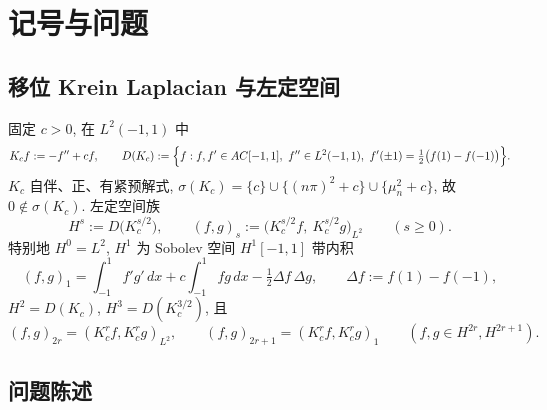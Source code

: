 \documentclass[UTF8]{ctexart}
\begin{document}
\tableofcontents

\section{记号与问题}

\subsection{移位 Krein Laplacian 与左定空间}

固定 $c > 0$, 在 $L^2(-1,1)$ 中
\begin{equation}
	K_c f := -f'' + c f, \qquad
	D(K_c) := \Bigl\{ f : f, f' \in AC[-1,1],\ f'' \in L^2(-1,1),\
		f'(\pm1) = \tfrac{1}{2}\bigl( f(1) - f(-1) \bigr) \Bigr\}.
\end{equation}
$K_c$ 自伴、正、有紧预解式, $\sigma(K_c) = \{c\} \cup \{(n\pi)^2+c\}
\cup \{\mu_n^2+c\}$, 故 $0 \notin \sigma(K_c)$. 左定空间族
\begin{equation}
	H^s := D\bigl(K_c^{s/2}\bigr), \qquad
	(f,g)_s := \bigl( K_c^{s/2} f,\ K_c^{s/2} g \bigr)_{L^2} \qquad (s \geq 0).
\end{equation}
特别地 $H^0 = L^2$, $H^1$ 为 Sobolev 空间 $H^1[-1,1]$ 带内积
\begin{equation}
	(f,g)_1 = \int_{-1}^{1} f'g'\, dx + c \int_{-1}^{1} f g\, dx
		- \tfrac12 \Delta f\, \Delta g, \qquad \Delta f := f(1) - f(-1),
\end{equation}
$H^2 = D(K_c)$, $H^3 = D(K_c^{3/2})$, 且
\begin{equation}
	(f,g)_{2r} = (K_c^r f, K_c^r g)_{L^2}, \qquad
	(f,g)_{2r+1} = (K_c^r f, K_c^r g)_1
	\qquad (f,g \in H^{2r}, H^{2r+1}).
\end{equation}

\subsection{问题陈述}
\end{document}
